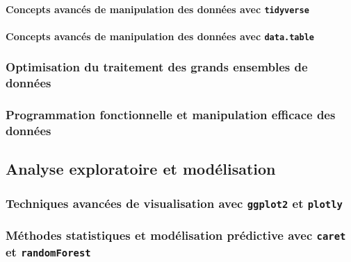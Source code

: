 \documentclass[
  letterpaper,
  DIV=11,
  numbers=noendperiod]{scrartcl}
\let\oldparagraph\paragraph
\renewcommand{\paragraph}[1]{\oldparagraph{#1}\mbox{}}
\begin{document}
\paragraph{\texorpdfstring{Concepts avancés de manipulation des données
avec
\texttt{tidyverse}}{Concepts avancés de manipulation des données avec tidyverse}}\label{concepts-avancuxe9s-de-manipulation-des-donnuxe9es-avec-tidyverse}

\paragraph{\texorpdfstring{Concepts avancés de manipulation des données
avec
\texttt{data.table}}{Concepts avancés de manipulation des données avec data.table}}\label{concepts-avancuxe9s-de-manipulation-des-donnuxe9es-avec-data.table}

\subsubsection{Optimisation du traitement des grands ensembles de
données}\label{optimisation-du-traitement-des-grands-ensembles-de-donnuxe9es}

\subsubsection{Programmation fonctionnelle et manipulation efficace des
données}\label{programmation-fonctionnelle-et-manipulation-efficace-des-donnuxe9es}

\subsection{Analyse exploratoire et
modélisation}\label{analyse-exploratoire-et-moduxe9lisation}

\subsubsection{\texorpdfstring{Techniques avancées de visualisation avec
\texttt{ggplot2} et
\texttt{plotly}}{Techniques avancées de visualisation avec ggplot2 et plotly}}\label{techniques-avancuxe9es-de-visualisation-avec-ggplot2-et-plotly}

\subsubsection{\texorpdfstring{Méthodes statistiques et modélisation
prédictive avec \texttt{caret} et
\texttt{randomForest}}{Méthodes statistiques et modélisation prédictive avec caret et randomForest}}\label{muxe9thodes-statistiques-et-moduxe9lisation-pruxe9dictive-avec-caret-et-randomforest}
\end{document}
